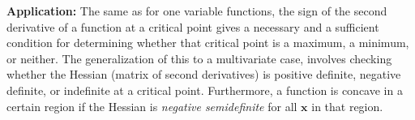 \documentclass[11pt]{article}
\begin{document}
\textbf{Application:} The same as for one variable functions, the sign
of the second derivative of a function at a critical point gives a
necessary and a sufficient condition for determining whether that
critical point is a maximum, a minimum, or neither. The generalization
of this to a multivariate case, involves checking whether the Hessian
(matrix of second derivatives) is positive definite, negative definite,
or indefinite at a critical point. Furthermore, a function is concave in
a certain region if the Hessian is \emph{negative semidefinite} for all
\(\mathbf{x}\) in that region.


    
    
    
    
\end{document}
